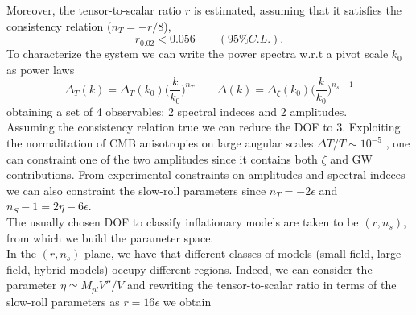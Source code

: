 \documentclass[11pt,a4paper,twoside]{book}
\begin{document}
Moreover, the tensor-to-scalar ratio $ r $ is estimated, assuming that it satisfies the consistency relation  ($ n_{T} = -r/8 $),
\begin{equation}
	r_{0.02} < 0.056 \qquad (95\% C.L.).
\end{equation}
To characterize the system we can write the power spectra w.r.t a pivot scale $ k_{0} $ as power laws
\begin{equation}
	\Delta_{T}(k) = \Delta_{T}(k_{0})\Big (\frac{k}{k_{0}}\Big)^{n_{T}} \qquad \Delta(k) = \Delta_{\zeta}(k_{0})\Big (\frac{k}{k_{0}}\Big)^{n_{s}-1}
\end{equation}
obtaining a set of 4 observables: 2 spectral indeces and 2 amplitudes.\\
Assuming the consistency relation true we can reduce the DOF to 3.  Exploiting the normalitation of CMB anisotropies on large angular scales $ \Delta T/T \sim 10^{-5}$ \cite{Chap2:Wilkinson}, one can constraint one of the two amplitudes since it contains both $\zeta$ and GW contributions.
From experimental constraints on amplitudes and spectral indeces we can also constraint  the slow-roll parameters since $ n_{T}=-2\epsilon $ and $ n_{S}-1=2\eta - 6\epsilon $.\\
The usually chosen DOF to classify inflationary models are taken to be $ (r,n_{s}) $, from which we build the parameter space.\\
In the $ (r,n_{s}) $ plane, we have that different classes of models (small-field, large-field, hybrid models) occupy different regions. Indeed, we can consider  the parameter $\eta\simeq M_{pl}V''/V$ and rewriting the tensor-to-scalar ratio in terms of the slow-roll parameters as $r=16\epsilon$ we obtain
\end{document}
